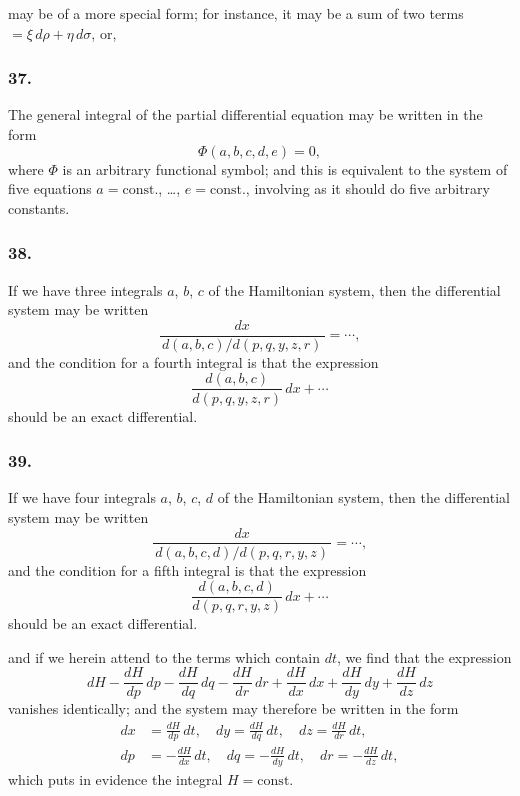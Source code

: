\documentclass[12pt,a4paper]{article}
\theoremstyle{plain}
\begin{document}
\newpage
\setcounter{page}{127}

may be of a more special form; for instance, it may be a sum of two terms $= \xi\,d\rho + \eta\,d\sigma$, or,

\subsubsection*{37.}

The general integral of the partial differential equation may be written in the form
\[
\Phi(a, b, c, d, e) = 0,
\]
where $\Phi$ is an arbitrary functional symbol; and this is equivalent to the system of five equations $a = \text{const.}$, \ldots, $e = \text{const.}$, involving as it should do five arbitrary constants.

\subsubsection*{38.}

If we have three integrals $a$, $b$, $c$ of the Hamiltonian system, then the differential system may be written
\[
\frac{dx}{\,d(a, b, c)/d(p, q, y, z, r)\,} = \cdots,
\]
and the condition for a fourth integral is that the expression
\[
\frac{d(a, b, c)}{d(p, q, y, z, r)}\,dx + \cdots
\]
should be an exact differential.

\subsubsection*{39.}

If we have four integrals $a$, $b$, $c$, $d$ of the Hamiltonian system, then the differential system may be written
\[
\frac{dx}{\,d(a, b, c, d)/d(p, q, r, y, z)\,} = \cdots,
\]
and the condition for a fifth integral is that the expression
\[
\frac{d(a, b, c, d)}{d(p, q, r, y, z)}\,dx + \cdots
\]
should be an exact differential.

\newpage
\setcounter{page}{128}

and if we herein attend to the terms which contain $dt$, we find that the expression
\[
dH - \frac{dH}{dp}\,dp - \frac{dH}{dq}\,dq - \frac{dH}{dr}\,dr + \frac{dH}{dx}\,dx + \frac{dH}{dy}\,dy + \frac{dH}{dz}\,dz
\]
vanishes identically; and the system may therefore be written in the form
\begin{align*}
dx &= \frac{dH}{dp}\,dt, \quad dy = \frac{dH}{dq}\,dt, \quad dz = \frac{dH}{dr}\,dt, \\
dp &= -\frac{dH}{dx}\,dt, \quad dq = -\frac{dH}{dy}\,dt, \quad dr = -\frac{dH}{dz}\,dt,
\end{align*}
which puts in evidence the integral $H = \text{const.}$
\end{document}
